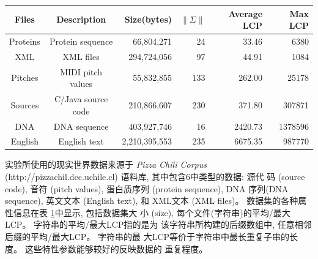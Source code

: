 \begin{table}[!htbp]
\begin{tabular}{|c|c|r|r|r|r|} \hline Files & Description &
  Size(bytes) & $\|\Sigma\|$ & Average LCP & Max LCP \\ \hline
  Proteins & Protein sequence & 66,804,271 & 24 & 33.46 & 6380\\
  XML & XML files & 294,724,056 & 97 & 44.91 & 1084 \\
  Pitches & MIDI pitch values & 55,832,855 & 133 & 262.00 & 25178\\
  Sources & C/Java source code & 210,866,607 & 230 & 371.80 & 307871\\
  DNA & DNA sequence & 403,927,746 & 16 & 2420.73 & 1378596\\
  English & English text & 2,210,395,553 & 235 &6675.35 & 987770\\
  \hline
  \end{tabular}
  \label{tab:data}
\end{table}

实验所使用的现实世界数据来源于 \emph{Pizza Chili Corpus}
(http://pizzachil.dcc.uchile.cl) 语料库, 其中包含6中类型的数据: 源代
码 (source code), 音符 (pitch values), 蛋白质序列 (protein sequence),
DNA 序列(DNA sequence), 英文文本 (English text), 和 XML文本 (XML
files)。 数据集的各种属性信息在表 \ref{tab:data}中显示, 包括数据集大
小 (size), 每个文件(字符串)的平均/最大LCP。 字符串的平均/最大LCP指的是为
该字符串所构建的后缀数组中, 任意相邻后缀的平均/最大LCP。 字符串的最
大LCP等价于字符串中最长重复子串的长度。 这些特性参数能够较好的反映数据的
重复程度。

